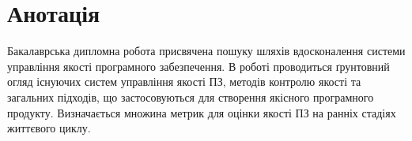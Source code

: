 \frontmatter
\chapter*{Анотація}

Бакалаврська дипломна робота присвячена пошуку шляхів вдосконалення системи управління якості програмного забезпечення. В роботі проводиться ґрунтовний огляд існуючих систем управління якості ПЗ, методів контролю якості та загальних підходів, що застосовуються для створення якісного програмного продукту. Визначається множина метрик для оцінки якості ПЗ на ранніх стадіях життєвого циклу.

\mainmatter
\newpage